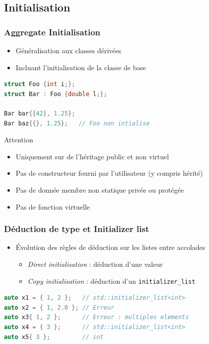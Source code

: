 \documentclass[C++.tex]{subfiles}
\begin{document}
\subsection*{Initialisation}
\begin{frame}[fragile]
	\frametitle{Aggregate Initialisation}
	\begin{itemize}
		\item Généralisation aux classes dérivées
		\item Incluant l'initialisation de la classe de base
	\end{itemize}

	\begin{lstlisting}[language=C++]
struct Foo {int i;};
struct Bar : Foo {double l;};

Bar bar{{42}, 1.25};
Bar baz{{}, 1.25};   // Foo non intialise\end{lstlisting}

	\begin{alertblock}{Attention}
		\begin{itemize}
			\item Uniquement sur de l'héritage public et non virtuel
			\item Pas de constructeur fourni par l'utilisateur (y compris hérité)
			\item Pas de donnée membre non statique privée ou protégée
			\item Pas de fonction virtuelle
		\end{itemize}
	\end{alertblock}

\end{frame}

\begin{frame}[fragile]
	\frametitle{Déduction de type et Initializer list}
	\begin{itemize}
		\item Évolution des règles de déduction sur les listes entre accolades
		\begin{itemize}
			\item \textit{Direct initialisation} : déduction d'une valeur
			
			
			\item \textit{Copy initialisation} : déduction d'un \lstinline|initializer_list|
			
		\end{itemize}
	\end{itemize}

	\begin{lstlisting}[language=C++]
auto x1 = { 1, 2 };   // std::initializer_list<int>
auto x2 = { 1, 2.0 }; // Erreur
auto x3{ 1, 2 };      // Erreur : multiples elements
auto x4 = { 3 };      // std::initializer_list<int>
auto x5{ 3 };         // int\end{lstlisting}
\end{frame}
\end{document}
